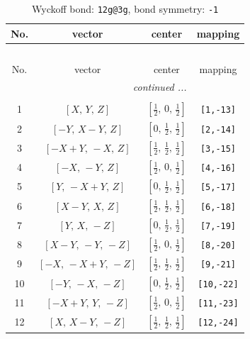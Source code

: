 \documentclass[fleqn,8pt]{jsarticle}
\begin{document}
\begin{longtable}{cccc}
\caption{Wyckoff bond: {\tt 12g@3g}, bond symmetry: {\tt -1}}
 \\
 \hline \hline
No. & vector & center & mapping \\ \hline \endfirsthead

\multicolumn{3}{l}{\tablename\ \thetable{}} \\
 \hline \hline
No. & vector & center & mapping \\ \hline \endhead

 \hline \hline
\multicolumn{3}{r}{\footnotesize\it continued ...} \\ \endfoot

 \hline \hline
\multicolumn{3}{r}{} \\ \endlastfoot

1 & $\left[ X,\, Y,\, Z \right]$ & $\left[ \frac{1}{2},\, 0,\, \frac{1}{2} \right]$ & {\tt [1,-13]} \\ \hline
2 & $\left[ - Y,\, X - Y,\, Z \right]$ & $\left[ 0,\, \frac{1}{2},\, \frac{1}{2} \right]$ & {\tt [2,-14]} \\ \hline
3 & $\left[ - X + Y,\, - X,\, Z \right]$ & $\left[ \frac{1}{2},\, \frac{1}{2},\, \frac{1}{2} \right]$ & {\tt [3,-15]} \\ \hline
4 & $\left[ - X,\, - Y,\, Z \right]$ & $\left[ \frac{1}{2},\, 0,\, \frac{1}{2} \right]$ & {\tt [4,-16]} \\ \hline
5 & $\left[ Y,\, - X + Y,\, Z \right]$ & $\left[ 0,\, \frac{1}{2},\, \frac{1}{2} \right]$ & {\tt [5,-17]} \\ \hline
6 & $\left[ X - Y,\, X,\, Z \right]$ & $\left[ \frac{1}{2},\, \frac{1}{2},\, \frac{1}{2} \right]$ & {\tt [6,-18]} \\ \hline
7 & $\left[ Y,\, X,\, - Z \right]$ & $\left[ 0,\, \frac{1}{2},\, \frac{1}{2} \right]$ & {\tt [7,-19]} \\ \hline
8 & $\left[ X - Y,\, - Y,\, - Z \right]$ & $\left[ \frac{1}{2},\, 0,\, \frac{1}{2} \right]$ & {\tt [8,-20]} \\ \hline
9 & $\left[ - X,\, - X + Y,\, - Z \right]$ & $\left[ \frac{1}{2},\, \frac{1}{2},\, \frac{1}{2} \right]$ & {\tt [9,-21]} \\ \hline
10 & $\left[ - Y,\, - X,\, - Z \right]$ & $\left[ 0,\, \frac{1}{2},\, \frac{1}{2} \right]$ & {\tt [10,-22]} \\ \hline
11 & $\left[ - X + Y,\, Y,\, - Z \right]$ & $\left[ \frac{1}{2},\, 0,\, \frac{1}{2} \right]$ & {\tt [11,-23]} \\ \hline
12 & $\left[ X,\, X - Y,\, - Z \right]$ & $\left[ \frac{1}{2},\, \frac{1}{2},\, \frac{1}{2} \right]$ & {\tt [12,-24]} \\
\end{longtable}
\end{document}

